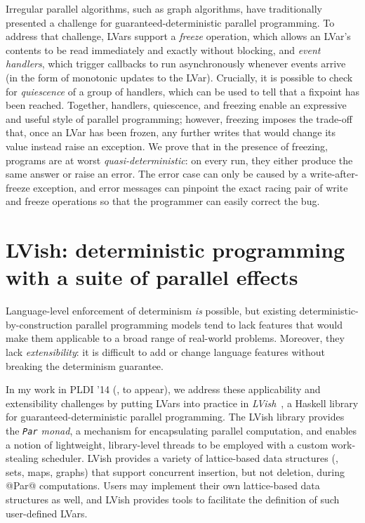 \documentclass{article}
\begin{document}
Irregular parallel algorithms, such as graph algorithms, have
traditionally presented a challenge for guaranteed-deterministic
parallel programming.  To address that challenge, LVars support a
\emph{freeze} operation, which allows an LVar's contents to be read
immediately and exactly without blocking, and \emph{event handlers},
which trigger callbacks to run asynchronously whenever events arrive
(in the form of monotonic updates to the LVar).  Crucially, it is
possible to check for \emph{quiescence} of a group of handlers, which
can be used to tell that a fixpoint has been reached.  Together,
handlers, quiescence, and freezing enable an expressive and useful
style of parallel programming; however, freezing imposes the trade-off
that, once an LVar has been frozen, any further writes that would
change its value instead raise an exception.  We prove that in the
presence of freezing, programs are at worst
\emph{quasi-deterministic}: on every run, they either produce the same
answer or raise an error.  The error case can only be caused by a
write-after-freeze exception, and error messages can pinpoint the
exact racing pair of write and freeze operations so that the
programmer can easily correct the bug.

\section{LVish: deterministic programming with a suite of parallel effects}\label{effectzoo}

Language-level enforcement of determinism \emph{is} possible, but
existing deterministic-by-construction parallel programming models
tend to lack features that would make them applicable to a broad range
of real-world problems. Moreover, they lack \emph{extensibility}: it
is difficult to add or change language features without breaking the
determinism guarantee.

In my work in PLDI '14 (\cite{effectzoo}, to appear), we address these
applicability and extensibility challenges by putting LVars into
practice in \emph{LVish}~\cite{LVish}, a Haskell library for
guaranteed-deterministic parallel programming.  The LVish library
provides the \emph{\lstinline|Par| monad}, a mechanism for
encapsulating parallel computation, and enables a notion of
lightweight, library-level threads to be employed with a custom
work-stealing scheduler.  LVish provides a variety of lattice-based
data structures (\eg, sets, maps, graphs) that support concurrent
insertion, but not deletion, during @Par@ computations.  Users may
implement their own lattice-based data structures as well, and LVish
provides tools to facilitate the definition of such user-defined
LVars.
\end{document}
